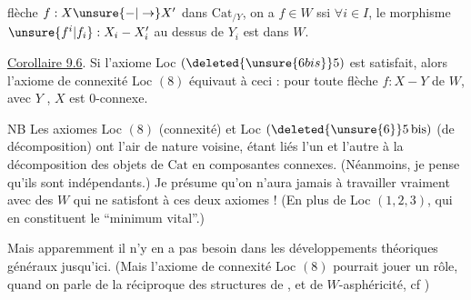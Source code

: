 
flèche $f:X\unsure{-|\to}X'$ dans $\mathrm{Cat}_{/Y}$, on a $f\in W$ ssi $\forall i\in I$,  le morphisme $\unsure{f^i|f_i}:X_i-X'_i$ au dessus de $Y_i$ est dans $W$.

\uline{Corollaire 9.6}. Si l'axiome Loc $(\deleted{\unsure{6 bis}}5)$ est satisfait, alors l'axiome de connexité Loc $(8)$ équivaut à ceci : pour toute flèche $f:X-Y$ de $W$, avec $Y$ , $X$ est $0$-connexe.

NB Les axiomes Loc $(8)$ (connexité) et Loc $(\deleted{\unsure{6}}5\,\mathrm{bis})$  (de décomposition) ont l'air de nature voisine,   étant liés l'un et l'autre  à la décomposition des objets de $\mathrm{Cat}$ en composantes connexes. (Néanmoins, je pense qu'ils sont indépendants.) Je présume qu'on n'aura jamais à travailler vraiment avec des $W$ qui ne satisfont à ces deux axiomes ! (En plus de Loc $(1,2,3)$, qui en constituent le ``minimum vital''.)

Mais apparemment il n'y en a pas besoin dans les développements théoriques généraux jusqu'ici. (Mais l'axiome de connexité Loc $(8)$ pourrait jouer un rôle, quand on parle de la  réciproque des structures de , et de $W$-asphéricité, cf )
